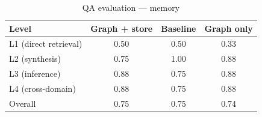 \begin{table}[h]
\centering
\caption{QA evaluation — memory}
\begin{tabular}{lccc}
\toprule
Level & Graph + store & Baseline & Graph only \\
\midrule
L1 (direct retrieval) & 0.50 & 0.50 & 0.33 \\
L2 (synthesis) & 0.75 & 1.00 & 0.88 \\
L3 (inference) & 0.88 & 0.75 & 0.88 \\
L4 (cross-domain) & 0.88 & 0.75 & 0.88 \\
\midrule
Overall & 0.75 & 0.75 & 0.74 \\
\bottomrule
\end{tabular}
\end{table}